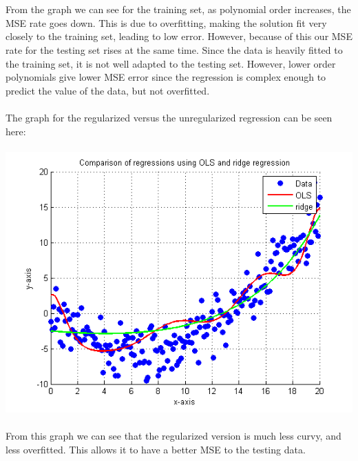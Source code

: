 \documentclass[paper=a4, fontsize=11pt]{scrartcl} %
\numberwithin{equation}{section} %
\numberwithin{figure}{section} %
\numberwithin{table}{section} %
\begin{document}
	\\\\
	From the graph we can see for the training set, as polynomial order increases, the MSE rate goes down. This is due to overfitting, making the solution fit very closely to the training set, leading to low error. However, because of this our MSE rate for the testing set rises at the same time. Since the data is heavily fitted to the training set, it is not well adapted to the testing set. However, lower order polynomials give lower MSE error since the regression is complex enough to predict the value of the data, but not overfitted.
	\\\\
	The graph for the regularized versus the unregularized regression can be seen here:
	\\\\
	\includegraphics[]{OLS_vs_ridge}
	\\\\
	From this graph we can see that the regularized version is much less curvy, and less overfitted. This allows it to have a better MSE to the testing data.
	\newpage
\end{document}

